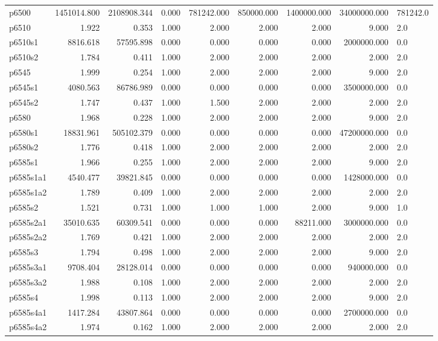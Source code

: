 \begin{longtable}{lrrrrrrrl}
p6500 & 1451014.800 & 2108908.344 & 0.000 & 781242.000 & 850000.000 & 1400000.000 & 34000000.000 & 781242.0 \\
p6510 & 1.922 & 0.353 & 1.000 & 2.000 & 2.000 & 2.000 & 9.000 & 2.0 \\
p6510s1 & 8816.618 & 57595.898 & 0.000 & 0.000 & 0.000 & 0.000 & 2000000.000 & 0.0 \\
p6510s2 & 1.784 & 0.411 & 1.000 & 2.000 & 2.000 & 2.000 & 2.000 & 2.0 \\
p6545 & 1.999 & 0.254 & 1.000 & 2.000 & 2.000 & 2.000 & 9.000 & 2.0 \\
p6545s1 & 4080.563 & 86786.989 & 0.000 & 0.000 & 0.000 & 0.000 & 3500000.000 & 0.0 \\
p6545s2 & 1.747 & 0.437 & 1.000 & 1.500 & 2.000 & 2.000 & 2.000 & 2.0 \\
p6580 & 1.968 & 0.228 & 1.000 & 2.000 & 2.000 & 2.000 & 9.000 & 2.0 \\
p6580s1 & 18831.961 & 505102.379 & 0.000 & 0.000 & 0.000 & 0.000 & 47200000.000 & 0.0 \\
p6580s2 & 1.776 & 0.418 & 1.000 & 2.000 & 2.000 & 2.000 & 2.000 & 2.0 \\
p6585s1 & 1.966 & 0.255 & 1.000 & 2.000 & 2.000 & 2.000 & 9.000 & 2.0 \\
p6585s1a1 & 4540.477 & 39821.845 & 0.000 & 0.000 & 0.000 & 0.000 & 1428000.000 & 0.0 \\
p6585s1a2 & 1.789 & 0.409 & 1.000 & 2.000 & 2.000 & 2.000 & 2.000 & 2.0 \\
p6585s2 & 1.521 & 0.731 & 1.000 & 1.000 & 1.000 & 2.000 & 9.000 & 1.0 \\
p6585s2a1 & 35010.635 & 60309.541 & 0.000 & 0.000 & 0.000 & 88211.000 & 3000000.000 & 0.0 \\
p6585s2a2 & 1.769 & 0.421 & 1.000 & 2.000 & 2.000 & 2.000 & 2.000 & 2.0 \\
p6585s3 & 1.794 & 0.498 & 1.000 & 2.000 & 2.000 & 2.000 & 9.000 & 2.0 \\
p6585s3a1 & 9708.404 & 28128.014 & 0.000 & 0.000 & 0.000 & 0.000 & 940000.000 & 0.0 \\
p6585s3a2 & 1.988 & 0.108 & 1.000 & 2.000 & 2.000 & 2.000 & 2.000 & 2.0 \\
p6585s4 & 1.998 & 0.113 & 1.000 & 2.000 & 2.000 & 2.000 & 9.000 & 2.0 \\
p6585s4a1 & 1417.284 & 43807.864 & 0.000 & 0.000 & 0.000 & 0.000 & 2700000.000 & 0.0 \\
p6585s4a2 & 1.974 & 0.162 & 1.000 & 2.000 & 2.000 & 2.000 & 2.000 & 2.0 \\

\end{longtable}
